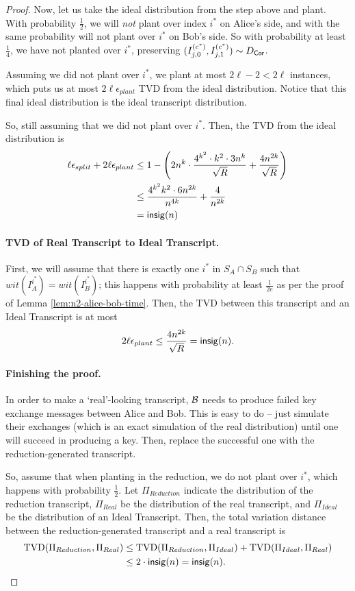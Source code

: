 \begin{proof}
	Now, let us take the ideal distribution from the step above and plant. With probability $\frac 1 2$, we will \emph{not} plant over index $i^*$ on Alice's side, and with the same probability will not plant over $i^*$ on Bob's side. So with probability at least $\frac 1 4$, we have not planted over $i^*$, preserving $(I_{j,0}^{(c^*)}, I_{j,1}^{(c^*)})\sim D_{\mathsf{Cor}}$.
	
	Assuming we did not plant over $i^*$, we plant at most $2\ell -2 < 2\ell$ instances, which puts us at most $2\ell \epsilon_{plant}$ TVD from the ideal distribution. Notice that this final ideal distribution is the ideal transcript distribution.
	
	So, still assuming that we did not plant over $i^*$. Then, the TVD from the ideal distribution is
	\begin{align*}
	\ell \epsilon_{split} + 2\ell \epsilon_{plant} &\le 1 - \left(2n^k \cdot \frac{ 4^{k^2} \cdot k^2 \cdot 3n^{k}}{\sqrt{R}} + \frac{4n^{2k}}{\sqrt R } \right)\\
	&\le \frac{4^{k^2} k^2 \cdot 6n^{2k}}{n^{4k}} + \frac{4}{n^{2k}}\\
	&= \mathsf{insig}(n)
	\end{align*}
	
	\paragraph{TVD of Real Transcript to Ideal Transcript.} First, we will assume that there is exactly one $i^*$ in $S_A \cap S_B$ such that $wit(I_A^{i^*}) = wit(I_B^{i^*})$; this happens with probability at least $\frac{1}{2e}$ as per the proof of Lemma \ref{lem:n2-alice-bob-time}. Then, the TVD between this transcript and an Ideal Transcript is at most
	\[2\ell \epsilon_{plant} \leq \frac{4n^{2k}}{\sqrt R} = \mathsf{insig}(n). \]
	
	\paragraph{Finishing the proof.}
	In order to make a `real'-looking transcript, ${\cal B}$ needs to produce failed key exchange messages between Alice and Bob. This is easy to do -- just simulate their exchanges (which is an exact simulation of the real distribution) until one will succeed in producing a key. Then, replace the successful one with the reduction-generated transcript.
	
	So, assume that when planting in the reduction, we do not plant over $i^*$, which happens with probability $\frac 1 2$. Let $\Pi_{Reduction}$ indicate the distribution of the reduction transcript, $\Pi_{Real}$ be the distribution of the real transcript, and $\Pi_{Ideal}$ be the distribution of an Ideal Transcript. Then, the total variation distance between the reduction-generated transcript and a real transcript is
	\begin{align*}
	\mathrm{TVD}(\Pi_{Reduction}, \Pi_{Real}) &\le \mathrm{TVD}(\Pi_{Reduction}, \Pi_{Ideal}) + \mathrm{TVD}(\Pi_{Ideal}, \Pi_{Real})\\
	&\le 2\cdot \mathsf{insig}(n) = \mathsf{insig}(n).
	\end{align*}
	

\end{proof}
